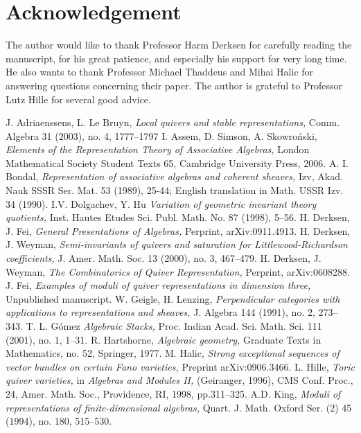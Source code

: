 \documentclass{amsart}
\theoremstyle{definition}
\theoremstyle{remark}
\numberwithin{equation}{section}
\begin{document}
\section*{Acknowledgement}
The author would like to thank Professor Harm Derksen for carefully reading the manuscript, for his great patience, and especially his support for very long time. He also wants to thank Professor Michael Thaddeus and Mihai Halic for answering questions concerning their paper. The author is grateful to Professor Lutz Hille for several good advice.


\begin{thebibliography}{19}
 J. Adriaenssens, L. Le Bruyn, \textit{Local quivers and stable representations,} Comm. Algebra 31 (2003), no. 4, 1777--1797
  I. Assem, D. Simson, A. Skowro\'{n}ski, \textit{Elements of the Representation Theory of Associative Algebras,} London Mathematical Society Student Texts 65, Cambridge University Press, 2006.
 A. I. Bondal, \textit{Representation of associative algebras and coherent sheaves,} Izv, Akad. Nauk SSSR Ser. Mat. 53 (1989), 25-44; English translation in Math. USSR Izv. 34 (1990).
 I.V. Dolgachev, Y. Hu \textit{Variation of geometric invariant theory quotients,} Inst. Hautes Etudes Sci. Publ. Math. No. 87 (1998), 5--56.
 H. Derksen, J. Fei, \textit{General Presentations of Algebras,} Perprint, arXiv:0911.4913.
 H. Derksen, J. Weyman, \textit{Semi-invariants of quivers and saturation for Littlewood-Richardson coefficients,} J. Amer. Math. Soc. 13 (2000), no. 3, 467--479.
 H. Derksen, J. Weyman, \textit{The Combinatorics of Quiver Representation,} Perprint, arXiv:0608288.
 J. Fei, \textit{Examples of moduli of quiver representations in dimension three,} Unpublished manuscript.
 W. Geigle, H. Lenzing, \textit{Perpendicular categories with applications to representations and sheaves,} J. Algebra 144 (1991), no. 2, 273--343.
 T. L. G\'{o}mez \textit{Algebraic Stacks,}  Proc. Indian Acad. Sci. Math. Sci. 111 (2001), no. 1, 1--31.
 R. Hartshorne, \textit{Algebraic geometry,} Graduate Texts in Mathematics, no. 52, Springer, 1977.
 M. Halic, \textit{Strong exceptional sequences of vector bundles on certain Fano varieties,} Preprint arXiv:0906.3466.
 L. Hille, \textit{Toric quiver varieties,} in {\em Algebras and Modules II,} (Geiranger, 1996), CMS Conf. Proc., 24, Amer. Math. Soc., Providence, RI, 1998, pp.311--325.
 A.D. King, \textit{Moduli of representations of finite-dimensional algebras,} Quart. J. Math. Oxford Ser. (2) 45 (1994), no. 180, 515--530.

\end{thebibliography}
\end{document}
